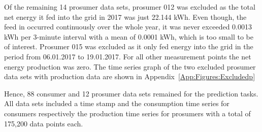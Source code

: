 Of the remaining 14 prosumer data sets, prosumer 012 was excluded as the total net energy it fed into the grid in 2017 was just 22.144 kWh. Even though, the feed in occurred continuously over the whole year, it was never exceeded 0.0013 kWh per 3-minute interval with a mean of 0.0001 kWh, which is too small to be of interest. Prosumer 015 was excluded as it only fed energy into the grid in the period from 06.01.2017 to 19.01.2017. For all other measurement points the net energy production was zero. The time series graph of the two excluded prosumer data sets with production data are shown in Appendix~\ref{App:Figures:Excludedp}

Hence, 88 consumer and 12 prosumer data sets remained for the prediction tasks. All data sets included a time stamp and the consumption time series for consumers respectively the production time series for prosumers with a total of 175,200 data points each.


